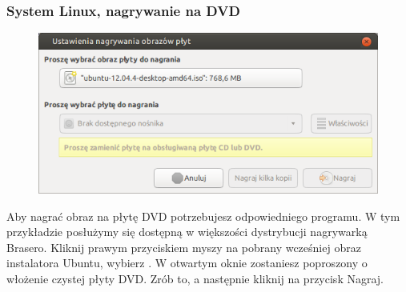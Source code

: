 \subsubsection{System Linux, nagrywanie na DVD}
\begin{figure}
                \includegraphics[width=\linewidth]{images/instalacja_nagrywanie_obrazu_linux_DVD.png}
\end{figure}

Aby nagrać obraz na płytę DVD potrzebujesz odpowiedniego programu. W tym przykładzie posłużymy się dostępną w większości dystrybucji nagrywarką Brasero. Kliknij prawym przyciskiem myszy na pobrany wcześniej obraz instalatora Ubuntu, wybierz
. W otwartym oknie zostaniesz poproszony o włożenie czystej płyty DVD. Zrób to, a następnie kliknij na przycisk \textcolor{ubuntu_orange}{Nagraj}.
\clearpage
